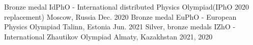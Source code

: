 
\begin{cvhonors}
    \cvhonor
     {Bronze medal}
     {IdPhO - International distributed Physics Olympiad(IPhO 2020 replacement)}
     {Moscow, Russia}
     {Dec. 2020}
    \cvhonor
     {Bronze medal}
     {EuPhO - European Physics Olympiad}
     {Talinn, Estonia}
     {Jun. 2021}
    \cvhonor
     {Silver, bronze medals}
     {IZhO - International Zhautikov Olympiad}
     {Almaty, Kazakhstan}
     {2021, 2020}
\end{cvhonors}
